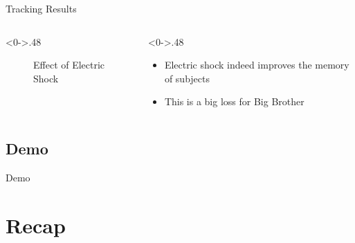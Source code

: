 \documentclass[10pt,aspectratio=43,mathserif]{beamer}
\begin{document}
\begin{frame}{Tracking Results}
\begin{columns}[T] %
\begin{column}<0->{.48\textwidth}
\begin{figure}[thpb]
\centering
{}
\caption{Effect of Electric Shock}
\label{fig:stimulus}
\end{figure}
\end{column}
\begin{column}<0->{.48\textwidth}
\begin{itemize}
\item Electric shock indeed improves the memory of subjects
\item This is a big loss for Big Brother
\end{itemize}
\end{column}
\end{columns}
\end{frame}
\subsection{Demo}  %
\begin{frame}{Demo}

\end{frame}
\section{Recap}
\end{document}
